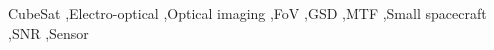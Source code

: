 \documentclass[final,5p,times,sort&compress,twocolumn]{elsarticle}
\begin{document}
\begin{frontmatter}

\begin{keyword}
	CubeSat \sep Electro-optical \sep Optical imaging  \sep  FoV \sep GSD \sep MTF \sep Small spacecraft \sep  SNR \sep  Sensor 

\end{keyword}
\end{frontmatter}
\end{document}
